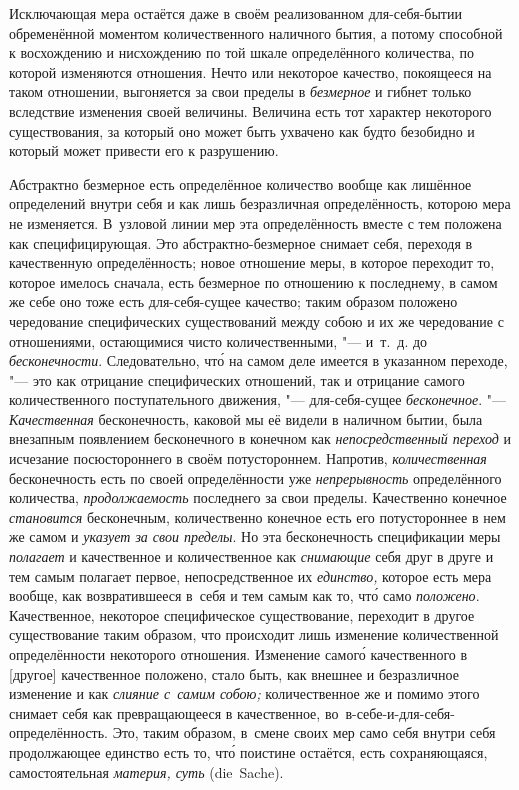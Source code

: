 
Исключающая мера остаётся даже в своём реализованном для-себя-бытии
обременённой моментом количественного наличного бытия, а потому способной к
восхождению и нисхождению по той шкале определённого количества, по которой
изменяются отношения. Нечто или некоторое качество, покоящееся на таком
отношении, выгоняется за свои пределы в {\em безмерное} и гибнет только
вследствие изменения своей величины. Величина есть тот характер некоторого
существования, за который оно может быть ухвачено как будто безобидно и который
может привести его к разрушению.

Абстрактно безмерное есть определённое количество вообще как лишённое
определений внутри себя и как лишь безразличная определённость, которою мера не
изменяется. В~узловой линии мер эта определённость вместе с тем положена как
специфицирующая. Это абстрактно-безмерное снимает себя, переходя в качественную
определённость; новое отношение меры, в которое переходит то, которое имелось
сначала, есть безмерное по отношению к последнему, в самом же себе оно тоже
есть для-себя-сущее качество; таким образом положено чередование специфических
существований между собою и их же чередование с отношениями, остающимися чисто
количественными, "--- и~т.~д. до {\em бесконечности}. Следовательно, чт\'{о} на
самом деле имеется в указанном переходе, "--- это как отрицание специфических
отношений, так и отрицание самого количественного поступательного движения,
"--- для-себя-сущее {\em бесконечное}. "--- {\em Качественная} бесконечность,
каковой мы её видели в наличном бытии, была внезапным появлением бесконечного в
конечном как {\em непосредственный переход} и исчезание посюстороннего в своём
потустороннем. Напротив, {\em количественная} бесконечность есть по своей
определённости уже {\em непрерывность} определённого количества,
{\em продолжаемость} последнего за свои пределы. Качественно конечное
{\em становится} бесконечным, количественно конечное есть его потустороннее в
нем же самом и {\em указует за свои пределы}. Но эта бесконечность спецификации
меры {\em полагает} и качественное и количественное как {\em снимающие} себя
друг в друге и тем самым полагает первое, непосредственное их {\em единство,}
которое есть мера вообще, как возвратившееся в~себя и тем самым как то, чт\'{о}
само {\em положено}. Качественное, некоторое специфическое существование,
переходит в другое существование таким образом, что происходит лишь изменение
количественной определённости некоторого отношения. Изменение самог\'{о}
качественного в [другое] качественное положено, стало быть, как внешнее и
безразличное изменение и как {\em слияние с~самим собою;} количественное же и
помимо этого снимает себя как превращающееся в качественное,
во~в-себе-и-для-себя-определённость. Это, таким образом, в~смене своих мер само
себя внутри себя продолжающее единство есть то, чт\'{о} поистине остаётся, есть
сохраняющаяся, самостоятельная {\em материя, суть} (die~Sache).

